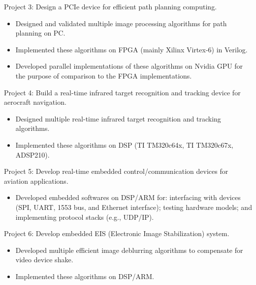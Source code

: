 \documentclass[11pt]{res} %
\begin{document}
\begin{resume}
Project 3: Design a PCIe device for efficient path planning computing. 
\begin{itemize} \itemsep -2pt 
\item Designed and validated multiple image processing algorithms for path planning on PC.
\item Implemented these algorithms on FPGA  (mainly Xilinx Virtex-6) in Verilog.
\item Developed parallel implementations of these algorithms on Nvidia GPU for the purpose of comparison to the FPGA implementations.
\end{itemize}

\vspace{-8pt}

Project 4: Build a real-time infrared target recognition and tracking device for  aerocraft navigation.
\begin{itemize} \itemsep -2pt 
\item Designed multiple real-time infrared target recognition and tracking algorithms.
\item Implemented these algorithms on DSP  (TI TM320c64x, TI TM320c67x, ADSP210).
\end{itemize}

\vspace{-8pt}

Project 5: Develop real-time embedded control/communication devices for aviation applications.

\begin{itemize} \itemsep -2pt 
\item Developed embedded softwares on DSP/ARM for: interfacing with devices (SPI, UART, 1553 bus, and Ethernet  interface); testing hardware models; and implementing protocol stacks (e.g., UDP/IP).

\end{itemize}

\vspace{-8pt}

Project 6: Develop embedded EIS (Electronic Image Stabilization) system.

\begin{itemize} \itemsep -2pt 
\item Developed multiple efficient image deblurring algorithms to compensate for video device shake.
\item  Implemented these algorithms on DSP/ARM.
\end{itemize}




\end{resume}
\end{document}
